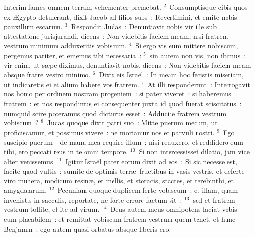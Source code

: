\lettrine[lines=3,image=true,loversize=0.05,lraise=-0.03]{I}{}nterim fames omnem terram vehementer premebat.
${}^{2}$~Consumptisque cibis quos ex \AE gypto detulerant, dixit Jacob ad filios suos~: Revertimini, et emite nobis pauxillum escarum.
${}^{3}$~Respondit Judas~: Denuntiavit nobis vir ille sub attestatione jurisjurandi, dicens~: Non videbitis faciem meam, nisi fratrem vestrum minimum adduxeritis vobiscum.
${}^{4}$~Si ergo vis eum mittere nobiscum, pergemus pariter, et ememus tibi necessaria~:
${}^{5}$~sin autem non vis, non ibimus~: vir enim, ut s\ae pe diximus, denuntiavit nobis, dicens~: Non videbitis faciem meam absque fratre vestro minimo.
${}^{6}$~Dixit eis Isra\"el~: In meam hoc fecistis miseriam, ut indicaretis ei et alium habere vos fratrem.
${}^{7}$~At illi responderunt~: Interrogavit nos homo per ordinem nostram progeniem~: si pater viveret~: si haberemus fratrem~: et nos respondimus ei consequenter juxta id quod fuerat sciscitatus~: numquid scire poteramus quod dicturus esset~: Adducite fratrem vestrum vobiscum~?
${}^{8}$~Judas quoque dixit patri suo~: Mitte puerum mecum, ut proficiscamur, et possimus vivere~: ne moriamur nos et parvuli nostri.
${}^{9}$~Ego suscipio puerum~: de manu mea require illum~: nisi reduxero, et reddidero eum tibi, ero peccati reus in te omni tempore.
${}^{10}$~Si non intercessisset dilatio, jam vice alter venissemus.
${}^{11}$~Igitur Isra\"el pater eorum dixit ad eos~: Si sic necesse est, facite quod vultis~: sumite de optimis terr\ae\ fructibus in vasis vestris, et deferte viro munera, modicum resin\ae , et mellis, et storacis, stactes, et terebinthi, et amygdalarum.
${}^{12}$~Pecuniam quoque duplicem ferte vobiscum~: et illam, quam invenistis in sacculis, reportate, ne forte errore factum sit~:
${}^{13}$~sed et fratrem vestrum tollite, et ite ad virum.
${}^{14}$~Deus autem meus omnipotens faciat vobis eum placabilem~: et remittat vobiscum fratrem vestrum quem tenet, et hunc Benjamin~: ego autem quasi orbatus absque liberis ero.


